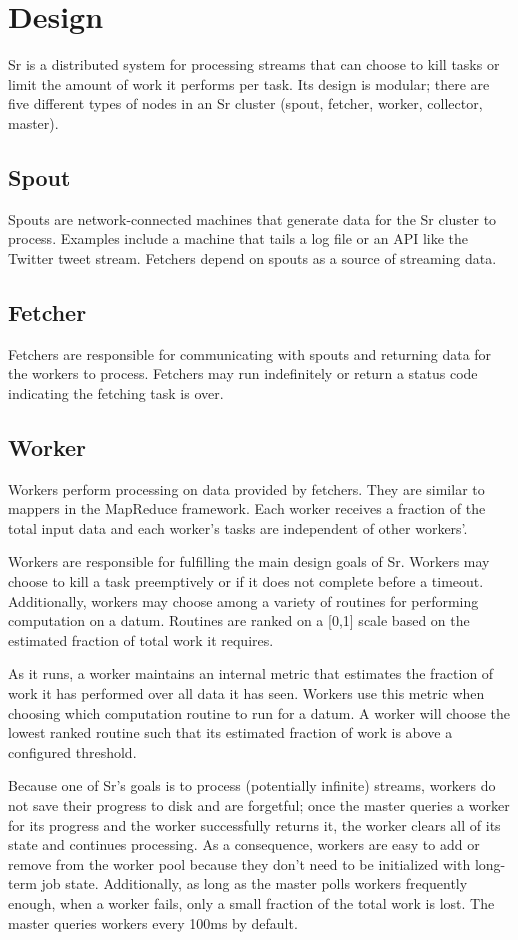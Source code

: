 \documentclass[12pt]{article}
\begin{document}
\section{Design}
\label{sec:design}
Sr is a distributed system for processing streams that can choose to kill tasks or limit the amount of work it performs per task. Its design is modular; there are five different types of nodes in an Sr cluster (spout, fetcher, worker, collector, master).
\subsection{Spout}
Spouts are network-connected machines that generate data for the Sr cluster to process. Examples include a machine that tails a log file or an API like the Twitter tweet stream. Fetchers depend on spouts as a source of streaming data.
\subsection{Fetcher}
Fetchers are responsible for communicating with spouts and returning data for the workers to process. Fetchers may run indefinitely or return a status code indicating the fetching task is over.
\subsection{Worker}
Workers perform processing on data provided by fetchers. They are similar to mappers in the MapReduce framework. Each worker receives a fraction of the total input data and each worker’s tasks are independent of other workers’.

Workers are responsible for fulfilling the main design goals of Sr. Workers may choose to kill a task preemptively or if it does not complete before a timeout. Additionally, workers may choose among a variety of routines for performing computation on a datum. Routines are ranked on a [0,1] scale based on the estimated fraction of total work it requires.

As it runs, a worker maintains an internal metric that estimates the fraction of work it has performed over all data it has seen. Workers use this metric when choosing which computation routine to run for a datum. A worker will choose the lowest ranked routine such that its estimated fraction of work is above a configured threshold.

Because one of Sr’s goals is to process (potentially infinite) streams, workers do not save their progress to disk and are forgetful; once the master queries a worker for its progress and the worker successfully returns it, the worker clears all of its state and continues processing. As a consequence, workers are easy to add or remove from the worker pool because they don’t need to be initialized with long-term job state. Additionally, as long as the master polls workers frequently enough, when a worker fails, only a small fraction of the total work is lost. The master queries workers every 100ms by default.
\end{document}
